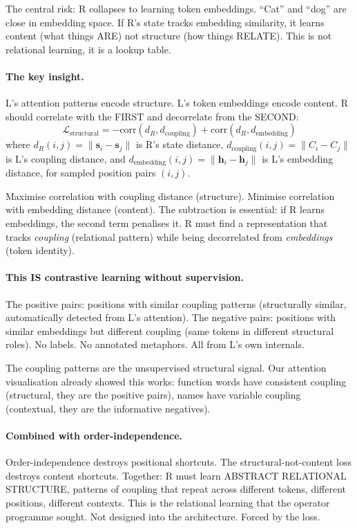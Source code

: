 \documentclass[11pt, a4paper]{article}
\newcommand{\h}{\mathbf{h}}
\theoremstyle{plain}
\theoremstyle{definition}
\theoremstyle{remark}
\begin{document}
The central risk: R collapses to learning token embeddings.
``Cat'' and ``dog'' are close in embedding space.
If R's state tracks embedding similarity, it learns content (what things ARE) not structure (how things RELATE).
This is not relational learning, it is a lookup table.

\paragraph{The key insight.}
L's attention patterns encode structure.
L's token embeddings encode content.
R should correlate with the FIRST and decorrelate from the SECOND:
\begin{equation}
\mathcal{L}_{\mathrm{structural}} = -\mathrm{corr}(d_R, d_{\mathrm{coupling}}) + \mathrm{corr}(d_R, d_{\mathrm{embedding}})
\end{equation}
where $d_R(i,j) = \|\mathbf{s}_i - \mathbf{s}_j\|$ is R's state distance, $d_{\mathrm{coupling}}(i,j) = \|C_i - C_j\|$ is L's coupling distance, and $d_{\mathrm{embedding}}(i,j) = \|\h_i - \h_j\|$ is L's embedding distance, for sampled position pairs $(i,j)$.

Maximise correlation with coupling distance (structure).
Minimise correlation with embedding distance (content).
The subtraction is essential: if R learns embeddings, the second term penalises it.
R must find a representation that tracks \emph{coupling} (relational pattern) while being decorrelated from \emph{embeddings} (token identity).

\paragraph{This IS contrastive learning without supervision.}
The positive pairs: positions with similar coupling patterns (structurally similar, automatically detected from L's attention).
The negative pairs: positions with similar embeddings but different coupling (same tokens in different structural roles).
No labels.
No annotated metaphors.
All from L's own internals.

The coupling patterns are the unsupervised structural signal.
Our attention visualisation already showed this works: function words have consistent coupling (structural, they are the positive pairs), names have variable coupling (contextual, they are the informative negatives).

\paragraph{Combined with order-independence.}
Order-independence destroys positional shortcuts.
The structural-not-content loss destroys content shortcuts.
Together: R must learn ABSTRACT RELATIONAL STRUCTURE, patterns of coupling that repeat across different tokens, different positions, different contexts.
This is the relational learning that the operator programme sought.
Not designed into the architecture.
Forced by the loss.
\end{document}
